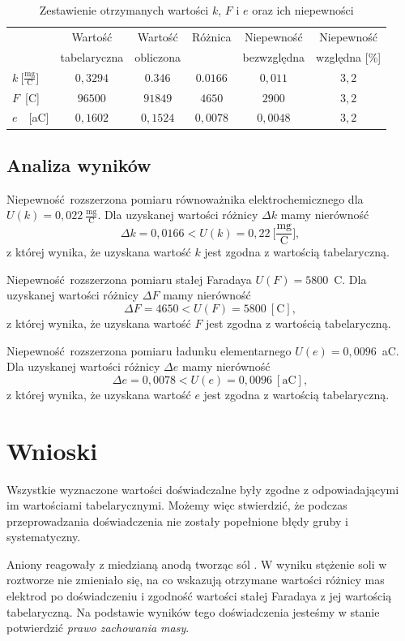 \documentclass[12pt,a4paper]{article}
\numberwithin{equation}{section}
\begin{document}
\begin{table}[!ht]
	\caption{Zestawienie otrzymanych wartości $k$, $F$ i $e$ oraz ich niepewności}
	\centering
	\begin{tabular}{l|c|c|c|c|c}
		\hline & Wartość & Wartość & Różnica & Niepewność & Niepewność \\ 
		& tabelaryczna & obliczona &  & bezwzględna & względna [\%] \\ \hline \hline
		$k~\big[\frac{\textrm{mg}}{\textrm{C}}\big]$ & $0,3294$ & $0.346$ & $0.0166$ & $0,011$ & $3,2$   \\
		$F$~[C] & $96500$ & $91849$  & $4650$ & $2900$ & $3,2$ \\
		$e$~~[aC] & $0,1602$ & $0,1524$ & $ 0,0078$ & $0,0048$ & $3,2$ \\ \hline
	\end{tabular}
	\label{tab:tab2}
\end{table}

\subsection{Analiza wyników}

Niepewność rozszerzona pomiaru równoważnika elektrochemicznego dla  $U(k) = 0,022~\frac{\textrm{mg}}{\textrm{C}}$.
Dla uzyskanej wartości różnicy $\Delta k$ mamy nierówność
\begin{equation}
	\Delta k = 0,0166 < U(k) = 0,22~\Big[\frac{\textrm{mg}}{\textrm{C}}\Big],
\end{equation}
z której wynika, że uzyskana wartość $k$ jest zgodna z wartością tabelaryczną.

Niepewność rozszerzona pomiaru stałej Faradaya $U(F) = 5800$~C.
Dla uzyskanej wartości różnicy $\Delta F$ mamy nierówność
\begin{equation}
\Delta F = 4650 < U(F) = 5800~[\textrm{C}],
\end{equation}
z której wynika, że uzyskana wartość $F$ jest zgodna z wartością tabelaryczną.

Niepewność rozszerzona pomiaru ładunku elementarnego $U(e) = 0,0096$~aC.
Dla uzyskanej wartości różnicy $\Delta e$ mamy nierówność
\begin{equation}
\Delta e = 0,0078 < U(e) = 0,0096~[\textrm{aC}],
\end{equation}
z której wynika, że uzyskana wartość $e$ jest zgodna z wartością tabelaryczną.

\section{Wnioski}

Wszystkie wyznaczone wartości doświadczalne były zgodne z odpowiadającymi im wartościami tabelarycznymi. Możemy więc stwierdzić, że podczas przeprowadzania doświadczenia nie zostały popełnione błędy gruby i systematyczny.

Aniony  reagowały z miedzianą anodą tworząc sól . W wyniku stężenie soli w roztworze nie zmieniało się, na co wskazują otrzymane wartości różnicy mas elektrod po doświadczeniu i zgodność wartości stałej Faradaya z jej wartością tabelaryczną. Na podstawie wyników tego doświadczenia jesteśmy w stanie potwierdzić \textit{prawo zachowania masy}.
\end{document}
